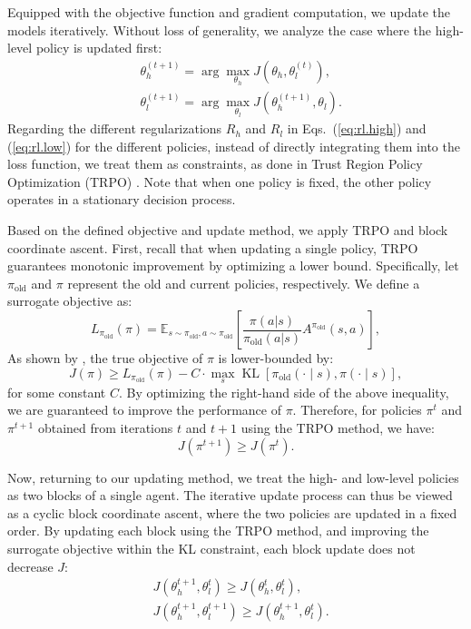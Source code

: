 Equipped with the objective function and gradient computation, we update the models iteratively. Without loss of generality, we analyze the case where the high-level policy is updated first:
\begin{align*}
    &\theta_h^{(t+1)} = \arg\max_{\theta_h} J(\theta_h, \theta_l^{(t)}), \\
    &\theta_l^{(t+1)} = \arg\max_{\theta_l} J(\theta_h^{(t+1)}, \theta_l).
\end{align*}
Regarding the different regularizations $R_h$ and $R_l$ in Eqs.~(\ref{eq:rl.high}) and (\ref{eq:rl.low}) for the different policies, instead of directly integrating them into the loss function, we treat them as constraints, as done in Trust Region Policy Optimization (TRPO) \citep{DBLP:conf/icml/SchulmanLAJM15}. Note that when one policy is fixed, the other policy operates in a stationary decision process.

Based on the defined objective and update method, we apply TRPO and block coordinate ascent. First, recall that when updating a single policy, TRPO guarantees monotonic improvement by optimizing a lower bound. Specifically, let $\pi_{\text{old}}$ and $\pi$ represent the old and current policies, respectively. We define a surrogate objective as:
$$
L_{\pi_{\text{old}}}(\pi) = \mathbb{E}_{s\sim \pi_\text{old}, a\sim \pi_\text{old}}\left[ \frac{\pi(a|s)}{\pi_\text{old}(a|s)}A^{\pi_{\text{old}}} (s, a) \right],
$$
As shown by \citet{DBLP:conf/icml/SchulmanLAJM15}, the true objective of $\pi$ is lower-bounded by:
$$
J(\pi) \geq L_{\pi_{\text{old}}}(\pi) - C \cdot \max_s \operatorname{KL}[\pi_\text{old}(\cdot \mid s), \pi(\cdot \mid s)],
$$
for some constant $C$.
By optimizing the right-hand side of the above inequality, we are guaranteed to improve the performance of $\pi$. Therefore, for policies $\pi^t$ and $\pi^{t+1}$ obtained from iterations $t$ and $t+1$ using the TRPO method, we have:
$$
J(\pi^{t+1}) \geq J(\pi^t).
$$

Now, returning to our updating method, we treat the high- and low-level policies as two blocks of a single agent. The iterative update process can thus be viewed as a cyclic block coordinate ascent, where the two policies are updated in a fixed order. By updating each block using the TRPO method, and improving the surrogate objective within the KL constraint, each block update does not decrease $J$:
\begin{align*}
    &J(\theta_h^{t+1}, \theta_l^{t}) \geq J(\theta_h^{t}, \theta_l^{t}), \\
    &J(\theta_h^{t+1}, \theta_l^{t+1}) \geq J(\theta_h^{t+1}, \theta_l^{t}).
\end{align*}

